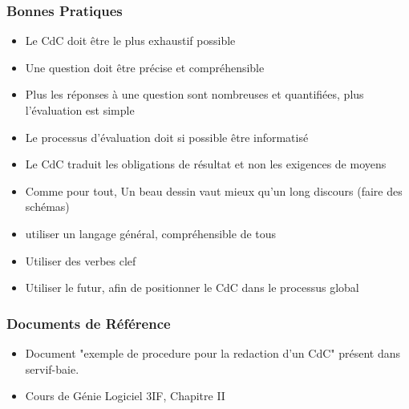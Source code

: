 {\subsubsection{Bonnes Pratiques}
   \begin{itemize}
    \item Le CdC doit être le plus exhaustif possible
    \item Une question doit être précise et compréhensible
    \item Plus les réponses à une question sont nombreuses et quantifiées, plus l'évaluation est simple
    \item Le processus d'évaluation doit si possible être informatisé
    \item Le CdC traduit les obligations de résultat et non les exigences de moyens
    \item Comme pour tout, Un beau dessin vaut mieux qu’un long discours (faire des schémas)
    \item utiliser un langage général, compréhensible de tous
    \item Utiliser des verbes clef
    \item Utiliser le futur, afin de positionner le CdC dans le processus global
  \end{itemize}
  \subsubsection{Documents de Référence}
  \begin{itemize}
\item Document "exemple de procedure pour la redaction d'un CdC" présent dans servif-baie.
\item Cours de Génie Logiciel 3IF, Chapitre II
\end{itemize}       
}

   